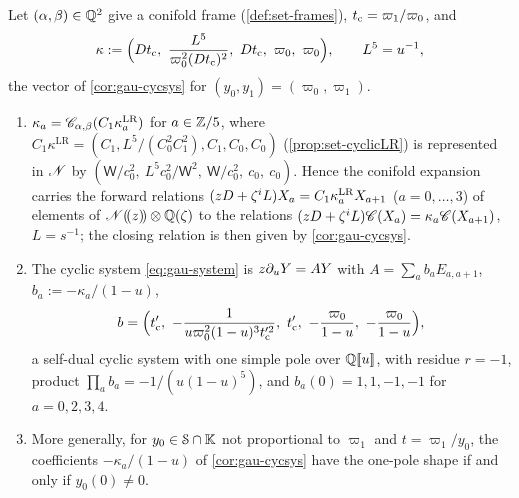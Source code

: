 \begin{prop}
\label{prop:gau-quintic}
Let $(\alpha,\beta)\in\mathbb{Q}^2$ give a conifold frame (\cref{def:set-frames}), $t_{\mathrm{c}}=\varpi_1/\varpi_0$, and
\[
\kappa:=\Bigl(\Dq\tc,\ \frac{L^5}{\varpi_0^2(\Dq\tc)^2},\ \Dq\tc,\ \varpi_0,\ \varpi_0\Bigr),\qquad L^5=u^{-1},
\]
the vector of \cref{cor:gau-cycsys} for $(y_0,y_1)=(\varpi_0,\varpi_1)$.
\begin{enumerate}
\item $\kappa_a=\mathscr{C}_{\alpha,\beta}(C_1\kappa^{\mathrm{LR}}_a)$ for $a\in\mathbb{Z}/5$, where $C_1\kappa^{\mathrm{LR}}=(C_1,L^5/(C_0^2C_1^2),C_1,C_0,C_0)$ (\cref{prop:set-cyclicLR}) is represented in $\mathscr{N}$ by $(\mathsf W/c_0^2,\ L^5c_0^2/\mathsf W^2,\ \mathsf W/c_0^2,\ c_0,\ c_0)$. Hence the conifold expansion carries the forward relations $(zD+\zeta^iL)X_a=C_1\kappa^{\mathrm{LR}}_aX_{a+1}$ ($a=0,\dots,3$) of elements of $\mathscr{N}(\!(z)\!)\otimes\mathbb{Q}(\zeta)$ to the relations $(zD+\zeta^iL)\mathscr{C}(X_a)=\kappa_a\mathscr{C}(X_{a+1})$, $L=s^{-1}$; the closing relation is then given by \cref{cor:gau-cycsys}.
\item The cyclic system \eqref{eq:gau-system} is $z\partial_uY=AY$ with $A=\sum_ab_aE_{a,a+1}$, $b_a:=-\kappa_a/(1-u)$,
\[
b=\Bigl(\tc',\ -\frac1{u\varpi_0^2(1-u)^3\tc'^2},\ \tc',\ -\frac{\varpi_0}{1-u},\ -\frac{\varpi_0}{1-u}\Bigr),
\]
a self-dual cyclic system with one simple pole over $\mathbb{Q}[\![ u ]\!]$, with residue $r=-1$, product $\prod_ab_a=-1/(u(1-u)^5)$, and $b_a(0)=1,1,-1,-1$ for $a=0,2,3,4$.
\item More generally, for $y_0\in\mathcal S\cap\mathbb{K}$ not proportional to $\varpi_1$ and $t=\varpi_1/y_0$, the coefficients $-\kappa_a/(1-u)$ of \cref{cor:gau-cycsys} have the one-pole shape if and only if $y_0(0)\neq0$.
\end{enumerate}
\end{prop}

